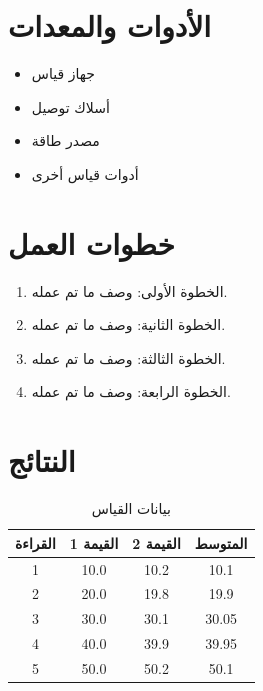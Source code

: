 \documentclass[11pt,a4paper]{article}
\begin{document}
\section{الأدوات والمعدات}
\label{sec:equipment}

\begin{itemize}
    \item جهاز قياس
    \item أسلاك توصيل
    \item مصدر طاقة
    \item أدوات قياس أخرى
\end{itemize}

\section{خطوات العمل}
\label{sec:procedure}

\begin{enumerate}
    \item الخطوة الأولى: وصف ما تم عمله.
    \item الخطوة الثانية: وصف ما تم عمله.
    \item الخطوة الثالثة: وصف ما تم عمله.
    \item الخطوة الرابعة: وصف ما تم عمله.
\end{enumerate}

\section{النتائج}
\label{sec:results}


\begin{table}[H]
\centering
\caption{بيانات القياس}
\begin{tabular}{|c|c|c|c|}
\hline
\textbf{القراءة} & \textbf{القيمة 1} & \textbf{القيمة 2} & \textbf{المتوسط} \\
\hline
1 & 10.0 & 10.2 & 10.1 \\
2 & 20.0 & 19.8 & 19.9 \\
3 & 30.0 & 30.1 & 30.05 \\
4 & 40.0 & 39.9 & 39.95 \\
5 & 50.0 & 50.2 & 50.1 \\
\hline
\end{tabular}
\end{table}
\end{document}
